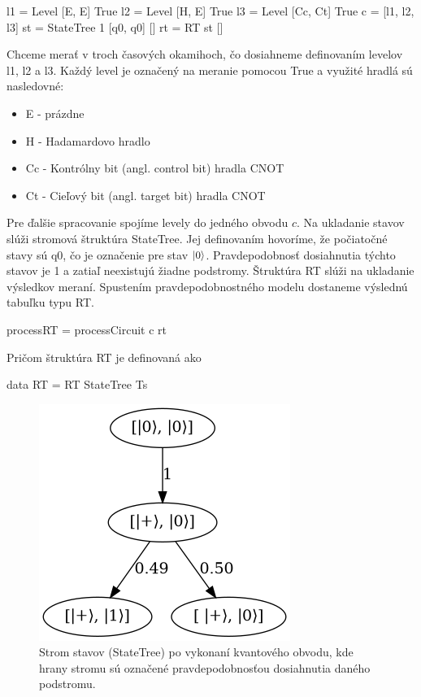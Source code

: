 \begin{code}
l1 = Level [E, E] True
l2 = Level [H, E] True
l3 = Level [Cc, Ct] True
c = [l1, l2, l3]
st = StateTree 1 [q0, q0] []
rt = RT st []
\end{code}

Chceme merať v troch časových okamihoch, čo dosiahneme definovaním levelov
l1, l2 a l3. Každý level je označený na meranie pomocou True a využité hradlá
sú nasledovné:
\begin{itemize}
    \item E - prázdne
    \item H - Hadamardovo hradlo
    \item Cc - Kontrólny bit (angl. control bit) hradla CNOT
    \item Ct - Cieľový bit (angl. target bit) hradla CNOT
\end{itemize}

Pre ďalšie spracovanie spojíme levely  do jedného obvodu \(c\). Na ukladanie
stavov slúži stromová štruktúra StateTree. Jej definovaním hovoríme, že
počiatočné stavy sú q0, čo je označenie pre stav \(\ket{0}\). Pravdepodobnosť
dosiahnutia týchto stavov je 1 a zatiaľ neexistujú žiadne podstromy. Štruktúra
RT slúži na ukladanie výsledkov meraní. Spustením pravdepodobnostného modelu
dostaneme výslednú tabuľku typu RT.

\begin{code}
processRT = processCircuit c rt
\end{code}

Pričom štruktúra RT je definovaná ako
\begin{code}
data RT = RT StateTree Ts
\end{code}

\begin{figure}
	\centering 
	\includegraphics[width=.4\textwidth]{figures/ST.png} 
	\caption{Strom stavov (StateTree) po vykonaní kvantového obvodu,
kde hrany stromu sú označené pravdepodobnosťou dosiahnutia daného podstromu.}
    \label{stateTree}
\end{figure}

